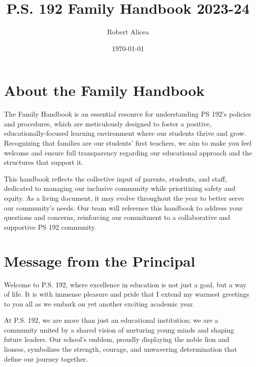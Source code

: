 \documentclass[11pt]{article}
\author{Robert Alicea}
\date{\today}
\title{P.S. 192 Family Handbook 2023-24}
\begin{document}


\pagenumbering{\fancyhf{}}
\pagestyle{headings}

\fancyhead[R]{\thepage}

\pagestyle{fancy}
\renewcommand{\footrulewidth}{1px}


\clearpage
\clearpage \tableofcontents \clearpage


\section{About the Family Handbook}
\label{sec:orgd22e1a0}
The Family Handbook is an essential resource for understanding PS 192's policies and procedures, which are meticulously designed to foster a positive, educationally-focused learning environment where our students thrive and grow. Recognizing that families are our students' first teachers, we aim to make you feel welcome and ensure full transparency regarding our educational approach and the structures that support it.

This handbook reflects the collective input of parents, students, and staff, dedicated to managing our inclusive community while prioritizing safety and equity. As a living document, it may evolve throughout the year to better serve our community's needs. Our team will reference this handbook to address your questions and concerns, reinforcing our commitment to a collaborative and supportive PS 192 community.

\clearpage

\section{Message from the Principal}
\label{sec:org4b673a2}

Welcome to P.S. 192, where excellence in education is not just a goal, but a way of life. It is with immense pleasure and pride that I extend my warmest greetings to you all as we embark on yet another exciting academic year.

At P.S. 192, we are more than just an educational institution; we are a community united by a shared vision of nurturing young minds and shaping future leaders. Our school’s emblem, proudly displaying the noble lion and lioness, symbolizes the strength, courage, and unwavering determination that define our journey together.
\end{document}
